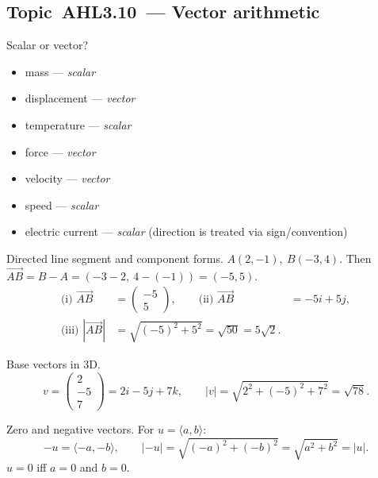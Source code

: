 \documentclass[11pt]{article}
\def\textbf#1{#1}%
\def\mathbf#1{#1}%
\newcommand{\tocsubsection}[1]{\subsection{#1}}
\begin{document}
\tocsubsection{Topic AHL3.10 — Vector arithmetic}


\begin{solution}
\textbf{Scalar or vector?}
\begin{itemize}
  \item mass — \emph{scalar}
  \item displacement — \emph{vector}
  \item temperature — \emph{scalar}
  \item force — \emph{vector}
  \item velocity — \emph{vector}
  \item speed — \emph{scalar}
  \item electric current — \emph{scalar} (direction is treated via sign/convention)
\end{itemize}
\end{solution}

\begin{solution}
\textbf{Directed line segment and component forms.}
$A(2,-1),\ B(-3,4)$. Then $\overrightarrow{AB}=\mathbf{B}-\mathbf{A}=(-3-2,\ 4-(-1))=(-5,5)$.
\begin{align*}
\text{(i) } \overrightarrow{AB}&=\begin{pmatrix}-5\\ 5\end{pmatrix},\qquad
\text{(ii) } \overrightarrow{AB}&=-5\mathbf{i}+5\mathbf{j},\\
\text{(iii) } |\overrightarrow{AB}|&=\sqrt{(-5)^2+5^2}=\sqrt{50}=5\sqrt{2}.
\end{align*}
\end{solution}

\begin{solution}
\textbf{Base vectors in 3D.}
\[
\mathbf{v}=\begin{pmatrix}2\\-5\\7\end{pmatrix}=2\mathbf{i}-5\mathbf{j}+7\mathbf{k},\qquad
|\mathbf{v}|=\sqrt{2^2+(-5)^2+7^2}=\sqrt{78}.
\]
\end{solution}

\begin{solution}
\textbf{Zero and negative vectors.}
For $\mathbf{u}=\langle a,b\rangle$:
\[
-\mathbf{u}=\langle -a,-b\rangle,\qquad |-\mathbf{u}|=\sqrt{(-a)^2+(-b)^2}=\sqrt{a^2+b^2}=|\mathbf{u}|.
\]
$\mathbf{u}=\mathbf{0}$ iff $a=0$ and $b=0$.
\end{solution}
\end{document}
